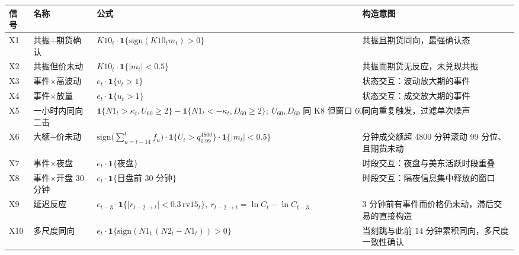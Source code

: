 \setlength{\tabcolsep}{4pt}
\begin{tabular}{llp{6.4cm}p{4.5cm}}
\toprule
信号 & 名称 & 公式 & 构造意图 \\
\midrule
X1 & 共振$+$期货确认 & $\displaystyle K10_t\cdot\mathbf{1}\{\mathrm{sign}(K10_t m_t)>0\}$ & 共振且期货同向，最强确认态 \\
X2 & 共振但价未动 & $\displaystyle K10_t\cdot\mathbf{1}\{|m_t|<0.5\}$ & 共振而期货无反应，未兑现共振 \\
X3 & 事件$\times$高波动 & $\displaystyle e_t\cdot\mathbf{1}\{v_t>1\}$ & 状态交互：波动放大期的事件 \\
X4 & 事件$\times$放量 & $\displaystyle e_t\cdot\mathbf{1}\{u_t>1\}$ & 状态交互：成交放大期的事件 \\
X5 & 一小时内同向二击 & $\displaystyle \mathbf{1}\{N1_t>\kappa_t, U_{60}\ge2\}-\mathbf{1}\{N1_t<-\kappa_t, D_{60}\ge2\};\ U_{60},D_{60}\text{ 同 K8 但窗口 }60$ & 同向重复触发，过滤单次噪声 \\
X6 & 大额$+$价未动 & $\displaystyle \mathrm{sign}\big(\textstyle\sum_{u=t-14}^{t} f_u\big)\cdot\mathbf{1}\{U_t>q^{4800}_{0.99}\}\cdot\mathbf{1}\{|m_t|<0.5\}$ & 分钟成交额超 4800 分钟滚动 99 分位、且期货未动 \\
X7 & 事件$\times$夜盘 & $\displaystyle e_t\cdot\mathbf{1}\{\text{夜盘}\}$ & 时段交互：夜盘与美东活跃时段重叠 \\
X8 & 事件$\times$开盘 30 分钟 & $\displaystyle e_t\cdot\mathbf{1}\{\text{日盘前 30 分钟}\}$ & 时段交互：隔夜信息集中释放的窗口 \\
X9 & 延迟反应 & $\displaystyle e_{t-3}\cdot\mathbf{1}\{|r_{t-2\to t}|<0.3\,\mathrm{rv}15_t\},\ r_{t-2\to t}\!=\!\ln C_t-\ln C_{t-3}$ & 3 分钟前有事件而价格仍未动，滞后交易的直接构造 \\
X10 & 多尺度同向 & $\displaystyle e_t\cdot\mathbf{1}\{\mathrm{sign}(N1_t\,(N2_t-N1_t))>0\}$ & 当刻跳与此前 14 分钟累积同向，多尺度一致性确认 \\
\bottomrule
\end{tabular}
